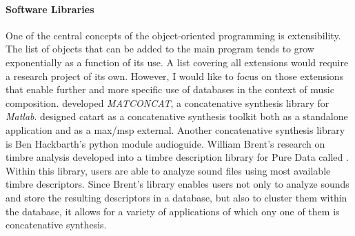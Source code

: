 {	\paragraph{Software Libraries}
	One of the central concepts of the object-oriented programming is extensibility. The list of objects that can be added to the main program tends to grow exponentially as a function of its use. A list covering all extensions would require a research project of its own. However, I would like to focus on those extensions that enable further and more specific use of databases in the context of music composition. \textcite{Stu04:Mat} developed \textit{MATCONCAT}, a concatenative synthesis library for \textit{Matlab}. \textcite{Sch06:Rea} designed \gls{catart} as a concatenative synthesis toolkit both as a standalone application and as a \gls{max/msp} external. Another concatenative synthesis library is Ben Hackbarth's python module \gls{audioguide}. William Brent's research on timbre analysis developed into a timbre description library for Pure Data called  \parencite{icmc/bbp2372.2010.044}. Within this library, users are able to analyze sound files using most available timbre descriptors. Since Brent's library enables users not only to analyze sounds and store the resulting descriptors in a database, but also to cluster them within the database, it allows for a variety of applications of which ony one of them is concatenative synthesis.
}
